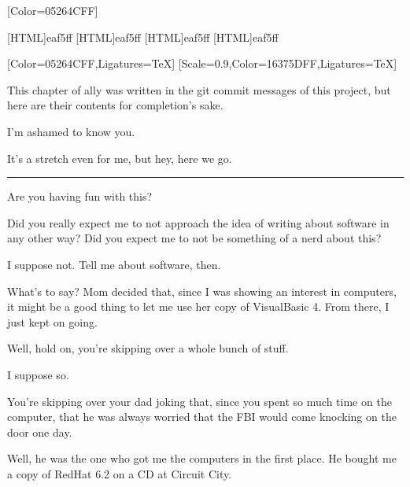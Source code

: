 \renewfontfamily{}[Color=05264CFF]

[HTML]{eaf5ff}
[HTML]{eaf5ff}
[HTML]{eaf5ff}
[HTML]{eaf5ff}
\begin{paracol}{2}
\begin{leftcolumn}

[Color=05264CFF,Ligatures=TeX]
\renewfontfamily{}[Scale=0.9,Color=16375DFF,Ligatures=TeX]

\noindent This chapter of ally was written in the git commit messages of this project, but here are their contents for completion's sake.

\begin{ally}
I'm ashamed to know you.
\end{ally}
It's a stretch even for me, but hey, here we go.

\begin{center}
\rule{1in}{0.1pt}
\end{center}

\begin{ally}
Are you having fun with this?
\end{ally}
Did you really expect me to not approach the idea of writing about software in any other way? Did you expect me to not be something of a nerd about this?

\begin{ally}
I suppose not. Tell me about software, then.
\end{ally}
What's to say? Mom decided that, since I was showing an interest in computers, it might be a good thing to let me use her copy of VisualBasic 4. From there, I just kept on going.

\begin{ally}
Well, hold on, you're skipping over a whole bunch of stuff.
\end{ally}
I suppose so.

\begin{ally}
You're skipping over your dad joking that, since you spent so much time on the computer, that he was always worried that the FBI would come knocking on the door one day.
\end{ally}
Well, he was the one who got me the computers in the first place. He bought me a copy of RedHat 6.2 on a CD at Circuit City.


\end{leftcolumn}
\end{paracol}
